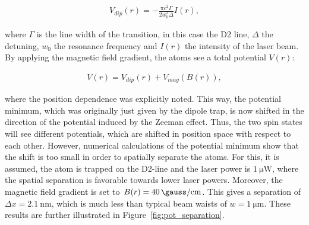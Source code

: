 \begin{align}
	V_{dip}(r) = -\frac{\pi c^2 \Gamma}{2 w_0^3 \Delta} I(r),
\end{align}

where $\Gamma$ is the line width of the transition, in this case the D2 line, $\Delta$ the detuning, $w_0$ the resonance frequency and $I(r)$ the intensity of the laser beam. By applying the magnetic field gradient, the atoms see a total potential $V(r)$:

\begin{align}
	V(r) = V_{dip}(r) + V_{mag}(B(r)),
\end{align}

where the position dependence was explicitly noted. This way, the potential minimum, which was originally just given by the dipole trap, is now shifted in the direction of the potential induced by the Zeeman effect. Thus, the two spin states will see different potentials, which are shifted in position space with respect to each other. However, numerical calculations of the potential minimum show that the shift is too small in order to spatially separate the atoms. For this, it is assumed, the atom is trapped on the D2-line and the laser power is $\SI{1}{\micro\watt}$, where the spatial separation is favorable towards lower laser powers. Moreover, the magnetic field gradient is set to $B(r) = \SI{40}{\gauss\per\centi\meter}$. This gives a separation of $\Delta x = \SI{2.1}{\nano\meter}$, which is much less than typical beam waists of $w = \SI{1}{\micro\meter}$.
These results are further illustrated in Figure~\ref{fig:pot_separation}.

\begin{figure}[t]%
\end{figure}


